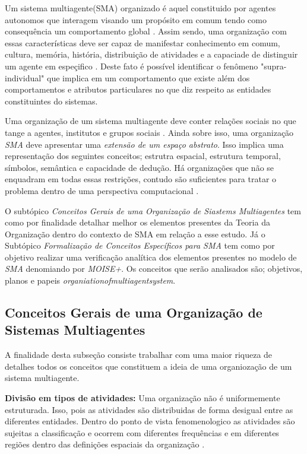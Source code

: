 Um sistema multiagente(SMA) organizado é aquel constituido por agentes autonomos que interagem visando um propósito em comum tendo como consequência um comportamento global \cite{mosieframework} 
\cite{organiationofmultiagentsystem}. Assim sendo, uma organização com essas características deve ser capaz de manifestar conhecimento em comum, cultura, memória, história, distribuição de atividades 
e a capaciade de distinguir um  agente em espeçifico \cite{organiationofmultiagentsystem}. Deste fato é possível identificar o fenômeno "supra-individual" que implica em um comportamento que existe
além dos comportamentos e atributos particulares no que diz respeito as entidades constituintes do sistemas. 

Uma organização de um sistema multiagente deve conter relações sociais no que tange a agentes, institutos e grupos sociais \cite{organiationofmultiagentsystem}. Ainda sobre isso, uma organização 
\textit{SMA} deve apresentar uma \textit{extensão de um espaço abstrato}. Isso implica uma representação dos seguintes conceitos; estrutra espacial, estrutura temporal, símbolos, semântica e 
capacidade de dedução. Há organizações que não se enquadram em todas essas restrições, contudo são suficientes para tratar o problema dentro de uma perspectiva computacional \cite{organiationofmultiagentsystem}.

O subtópico \textit{Conceitos Gerais de uma Organização de Siastems Multiagentes} tem como por finalidade detalhar melhor os elementos presentes da Teoria da Organização dentro do contexto de SMA
em relação a esse estudo. Já o Subtópico \textit{Formalização de Conceitos Específicos para SMA} tem como por objetivo realizar uma verificação analítica dos elementos presentes no modelo de \textit{SMA} 
denomiando por \textit{MOISE+}. Os conceitos que serão analisados são; objetivos, planos e papeis \textit{organiationofmultiagentsystem}.
   

\subsection{Conceitos Gerais de uma Organização de Sistemas Multiagentes}

A finalidade desta subseção consiste trabalhar com uma maior riqueza de detalhes todos os conceitos que constituem a ideia de uma organiozação de um sistema multiagente.  
  
\textbf{Divisão em tipos de atividades:} Uma organização não é uniformemente estruturada. Isso, pois as atividades são distribuidas de forma desigual entre as diferentes entidades.
Dentro do ponto de vista fenomenologico as atividades são sujeitas a classificação e ocorrem com diferentes frequências e em diferentes regiões dentro das definições espaciais da organização \cite{organiationofmultiagentsystem}.

